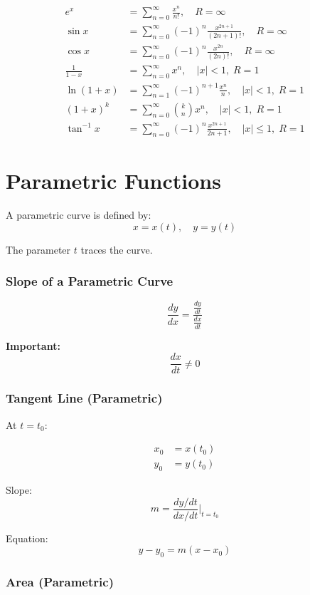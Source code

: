 \documentclass[11pt]{article}
\theoremstyle{mydef}
\begin{document}
\begin{align*}
e^x &= \sum_{n=0}^{\infty}\frac{x^n}{n!}, \quad R=\infty \\
\sin x &= \sum_{n=0}^{\infty}(-1)^n\frac{x^{2n+1}}{(2n+1)!}, \quad R=\infty \\
\cos x &= \sum_{n=0}^{\infty}(-1)^n\frac{x^{2n}}{(2n)!}, \quad R=\infty \\
\frac{1}{1-x} &= \sum_{n=0}^{\infty}x^n, \quad |x|<1,\; R=1 \\
\ln(1+x) &= \sum_{n=1}^{\infty}(-1)^{n+1}\frac{x^n}{n}, \quad |x|<1,\; R=1 \\
(1+x)^k &= \sum_{n=0}^{\infty} \binom{k}{n} x^n, \quad |x|<1,\; R=1 \\
\tan^{-1}x &= \sum_{n=0}^{\infty}(-1)^n \frac{x^{2n+1}}{2n+1}, \quad |x|\le 1,\; R=1
\end{align*}

\section*{Parametric Functions}

A parametric curve is defined by:
\[
x = x(t), \quad y = y(t)
\]

The parameter $t$ traces the curve.

\subsubsection*{Slope of a Parametric Curve}

\[
\frac{dy}{dx} = \frac{\frac{dy}{dt}}{\frac{dx}{dt}}
\]

\textbf{Important:}
\[
\frac{dx}{dt} \neq 0
\]

\subsubsection*{Tangent Line (Parametric)}

At $t=t_0$:

\begin{align*}
x_0 &= x(t_0) \\
y_0 &= y(t_0)
\end{align*}

Slope:
\[
m = \frac{dy/dt}{dx/dt}\Bigg|_{t=t_0}
\]

Equation:
\[
y - y_0 = m(x - x_0)
\]



\subsubsection*{Area (Parametric)}
\end{document}
